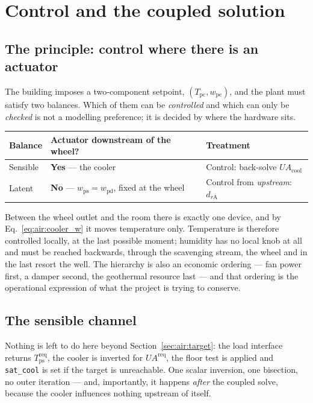 \documentclass[11pt]{article}
\newcommand{\UA}{\ensuremath{U\!A}}
\begin{document}
\section{Control and the coupled solution}
\label{sec:air:control}

\subsection{The principle: control where there is an actuator}
\label{sec:air:principle}

The building imposes a two-component setpoint, $(T_{\mathrm{pc}},
w_{\mathrm{pc}})$, and the plant must satisfy two balances. Which of them can
be \emph{controlled} and which can only be \emph{checked} is not a modelling
preference; it is decided by where the hardware sits.

\begin{center}
\begin{tabular}{@{}lll@{}}
\toprule
Balance & Actuator downstream of the wheel? & Treatment \\
\midrule
Sensible & \textbf{Yes} --- the cooler & Control: back-solve $\UA_{\mathrm{cool}}$ \\
Latent   & \textbf{No} --- $w_{\mathrm{ps}}=w_{\mathrm{pd}}$, fixed at the wheel & Control from \emph{upstream}: $d_{r\mathrm{A}}$ \\
\bottomrule
\end{tabular}
\end{center}

Between the wheel outlet and the room there is exactly one device, and by
Eq.~\eqref{eq:air:cooler_w} it moves temperature only. Temperature is therefore
controlled locally, at the last possible moment; humidity has no local knob at
all and must be reached backwards, through the scavenging stream, the wheel and
in the last resort the well. The hierarchy is also an economic ordering ---
fan power first, a damper second, the geothermal resource last --- and that
ordering is the operational expression of what the project is trying to
conserve.

\subsection{The sensible channel}
\label{sec:air:sensible}

Nothing is left to do here beyond Section~\ref{sec:air:target}: the load
interface returns $T_{\mathrm{ps}}^{\mathrm{req}}$, the cooler is inverted for
$\UA^{\mathrm{req}}$, the floor test is applied and \texttt{sat\_cool} is set
if the target is unreachable. One scalar inversion, one bisection, no outer
iteration --- and, importantly, it happens \emph{after} the coupled solve,
because the cooler influences nothing upstream of itself.
\end{document}
